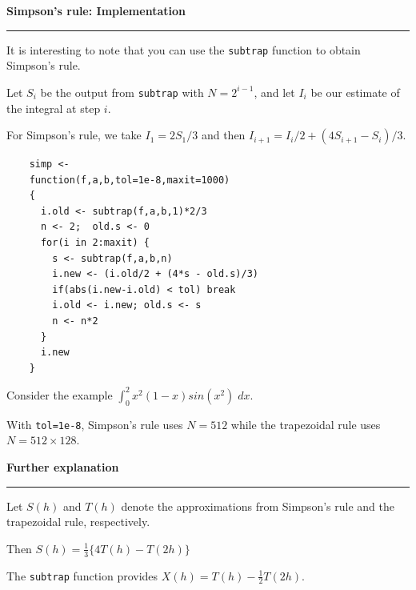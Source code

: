 \documentclass[12pt,letterpaper]{article}
\newcommand{\HRule}{\rule{\linewidth}{4pt}}
\newcommand{\vsphalf}{\vspace*{0.5cm}}
\begin{document}
\newpage

\fontsize{30}{30} \selectfont

\centerline{\textbf{Simpson's rule: Implementation}}

\HRule

\vsphalf

\fontsize{20}{25} \selectfont

It is interesting to note that you can use the \verb|subtrap|
function to obtain Simpson's rule.

\bigskip

Let $S_i$ be the output from \verb|subtrap| with $N = 2^{i-1}$, and
let $I_i$ be our estimate of the integral at step $i$.

\bigskip

For Simpson's rule, we take $I_1 = 2S_1/3$ and then $I_{i+1} = I_i/2 +
(4S_{i+1} - S_i)/3$.

\fontsize{18}{18} \selectfont

\begin{verbatim}
    simp <-
    function(f,a,b,tol=1e-8,maxit=1000)
    {
      i.old <- subtrap(f,a,b,1)*2/3
      n <- 2;  old.s <- 0
      for(i in 2:maxit) {
        s <- subtrap(f,a,b,n)
        i.new <- (i.old/2 + (4*s - old.s)/3)
        if(abs(i.new-i.old) < tol) break
        i.old <- i.new; old.s <- s
        n <- n*2
      }
      i.new
    }
\end{verbatim}

\fontsize{20}{25} \selectfont

Consider the example $\int_0^2 x^2(1-x)sin(x^2) \; dx$.

\bigskip

With \verb|tol=1e-8|, Simpson's rule uses $N = 512$ while the
trapezoidal rule uses $N = 512 \times 128$.

\newpage

\fontsize{30}{30} \selectfont

\centerline{\textbf{Further explanation}}

\HRule

\vsphalf

\fontsize{20}{25} \selectfont

Let $S(h)$ and $T(h)$ denote the approximations from Simpson's rule
and the trapezoidal rule, respectively.

\bigskip

Then $S(h) = \frac{1}{3} \{ 4 T(h) - T(2h) \}$

\bigskip \bigskip

The \verb|subtrap| function provides $X(h) = T(h) - \frac{1}{2}
T(2h)$.
\end{document}
